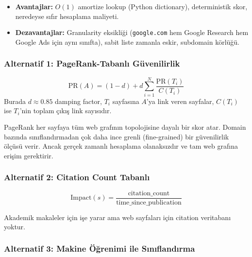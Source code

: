 \begin{itemize}
  \item \textbf{Avantajlar:} $O(1)$ amortize lookup (Python dictionary), deterministik skor, neredeyse s{\i}f{\i}r hesaplama maliyeti.
  \item \textbf{Dezavantajlar:} Granularity eksikli\u{g}i (\texttt{google.com} hem Google Research hem Google Ads i\c{c}in ayn{\i} s{\i}n{\i}fta), sabit liste zamanla eskir, subdomain k\"{o}rl\"{u}\u{g}\"{u}.
\end{itemize}

\subsubsection{Alternatif 1: PageRank-Tabanl{\i} G\"{u}venilirlik}

\begin{formulbox}
\begin{equation}
\label{eq:trust-pagerank}
\mathrm{PR}(A) = (1-d) + d \sum_{i=1}^{N} \frac{\mathrm{PR}(T_i)}{C(T_i)}
\end{equation}
Burada $d \approx 0.85$ damping factor, $T_i$ sayfas{\i}na $A$'ya link veren sayfalar, $C(T_i)$ ise $T_i$'nin toplam \c{c}{\i}k{\i}\c{s} link say{\i}s{\i}d{\i}r.
\end{formulbox}

PageRank her sayfaya t\"{u}m web graf{\i}n{\i}n topolojisine dayal{\i} bir skor atar. Domain baz{\i}nda s{\i}n{\i}fland{\i}rmadan \c{c}ok daha ince grenli (fine-grained) bir g\"{u}venilirlik \"{o}l\c{c}\"{u}s\"{u} verir. Ancak ger\c{c}ek zamanl{\i} hesaplama olanaks{\i}zd{\i}r ve tam web graf{\i}na eri\c{s}im gerektirir.

\subsubsection{Alternatif 2: Citation Count Tabanl{\i}}

\begin{equation}
\label{eq:impact-source}
\mathrm{Impact}(s) = \frac{\text{citation\_count}}{\text{time\_since\_publication}}
\end{equation}

Akademik makaleler i\c{c}in i\c{s}e yarar ama web sayfalar{\i} i\c{c}in citation veritaban{\i} yoktur.

\subsubsection{Alternatif 3: Makine \"{O}\u{g}renimi ile S{\i}n{\i}fland{\i}rma}

